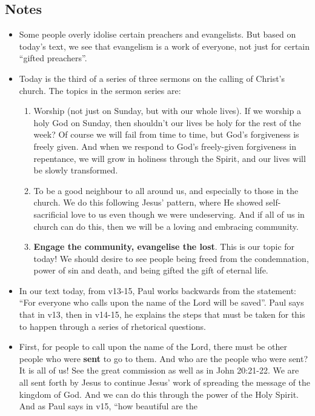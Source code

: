 \subsection*{Notes}
\begin{itemize}
  \item{Some people overly idolise certain preachers and evangelists. But
  based on today's text, we see that evangelism is a work of everyone, not
  just for certain ``gifted preachers''.}
  \item{Today is the third of a series of three sermons on the calling of
  Christ's church. The topics in the sermon series are:
  \begin{enumerate}
    \item Worship (not just on Sunday, but with our whole lives). If we
    worship a holy God on Sunday, then shouldn't our lives be holy for the
    rest of the week? Of course we will fail from time to time, but God's
    forgiveness is freely given. And when we respond to God's freely-given
    forgiveness in repentance, we will grow in holiness through the Spirit,
    and our lives will be slowly transformed.
    \item To be a good neighbour to all around us, and especially to those in
    the church. We do this following Jesus' pattern, where He showed
    self-sacrificial love to us even though we were undeserving. And if all
    of us in church can do this, then we will be a loving and embracing
    community.
    \item \textbf{Engage the community, evangelise the lost}. This is our
    topic for today! We should desire to see people being freed from the
    condemnation, power of sin and death, and being gifted the gift of
    eternal life.
  \end{enumerate}}
  \item{In our text today, from v13-15, Paul works backwards from the
  statement: ``For everyone who calls upon the name of the Lord will be
  saved''. Paul says that in v13, then in v14-15, he explains the steps that
  must be taken for this to happen through a series of rhetorical questions.}
  \item{First, for people to call upon the name of the Lord, there must be
  other people who were \textbf{sent} to go to them. And who are the people
  who were sent? It is all of us! See the great commission as well as in John
  20:21-22. We are all sent forth by Jesus to continue Jesus' work of
  spreading the message of the kingdom of God. And we can do this through the
  power of the Holy Spirit. And as Paul says in v15, ``how beautiful are the
}
\end{itemize}
